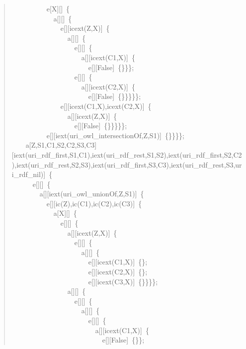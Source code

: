 \begin{quote}
{~~~~~~~~~~e[X][]~\{\\
~~~~~~~~~~~~a[][]~\{\\
~~~~~~~~~~~~~~e[][icext(Z,X)]~\{\\
~~~~~~~~~~~~~~~~a[][]~\{\\
~~~~~~~~~~~~~~~~~~e[][]~\{\\
~~~~~~~~~~~~~~~~~~~~a[][icext(C1,X)]~\{\\
~~~~~~~~~~~~~~~~~~~~~~e[][False]~\{\}\}\};\\
~~~~~~~~~~~~~~~~~~e[][]~\{\\
~~~~~~~~~~~~~~~~~~~~a[][icext(C2,X)]~\{\\
~~~~~~~~~~~~~~~~~~~~~~e[][False]~\{\}\}\}\}\};\\
~~~~~~~~~~~~~~e[][icext(C1,X),icext(C2,X)]~\{\\
~~~~~~~~~~~~~~~~a[][icext(Z,X)]~\{\\
~~~~~~~~~~~~~~~~~~e[][False]~\{\}\}\}\}\};\\
~~~~~~~~~~e[][iext(uri\_owl\_intersectionOf,Z,S1)]~\{\}\}\}\};\\
~~~~a[Z,S1,C1,S2,C2,S3,C3][iext(uri\_rdf\_first,S1,C1),iext(uri\_rdf\_rest,S1,S2),iext(uri\_rdf\_first,S2,C2),iext(uri\_rdf\_rest,S2,S3),iext(uri\_rdf\_first,S3,C3),iext(uri\_rdf\_rest,S3,uri\_rdf\_nil)]~\{\\
~~~~~~e[][]~\{\\
~~~~~~~~a[][iext(uri\_owl\_unionOf,Z,S1)]~\{\\
~~~~~~~~~~e[][ic(Z),ic(C1),ic(C2),ic(C3)]~\{\\
~~~~~~~~~~~~a[X][]~\{\\
~~~~~~~~~~~~~~e[][]~\{\\
~~~~~~~~~~~~~~~~a[][icext(Z,X)]~\{\\
~~~~~~~~~~~~~~~~~~e[][]~\{\\
~~~~~~~~~~~~~~~~~~~~a[][]~\{\\
~~~~~~~~~~~~~~~~~~~~~~e[][icext(C1,X)]~\{\};\\
~~~~~~~~~~~~~~~~~~~~~~e[][icext(C2,X)]~\{\};\\
~~~~~~~~~~~~~~~~~~~~~~e[][icext(C3,X)]~\{\}\}\}\};\\
~~~~~~~~~~~~~~~~a[][]~\{\\
~~~~~~~~~~~~~~~~~~e[][]~\{\\
~~~~~~~~~~~~~~~~~~~~a[][]~\{\\
~~~~~~~~~~~~~~~~~~~~~~e[][]~\{\\
~~~~~~~~~~~~~~~~~~~~~~~~a[][icext(C1,X)]~\{\\
~~~~~~~~~~~~~~~~~~~~~~~~~~e[][False]~\{\}\};\\
}
\end{quote}
